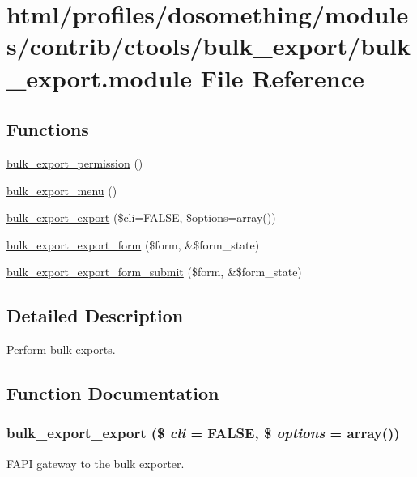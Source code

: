 \hypertarget{bulk__export_8module}{
\section{html/profiles/dosomething/modules/contrib/ctools/bulk\_\-export/bulk\_\-export.module File Reference}
\label{bulk__export_8module}
}
\subsection*{Functions}
\begin{DoxyCompactItemize}
\item 
\hyperlink{bulk__export_8module_a2a73fe75148a7d87b162a95e6ece51fe}{bulk\_\-export\_\-permission} ()
\item 
\hyperlink{bulk__export_8module_a7e9e45b8daed844ca0371fde54fa64d8}{bulk\_\-export\_\-menu} ()
\item 
\hyperlink{bulk__export_8module_a7607fa663a1a4bf08b865dbcad080b1d}{bulk\_\-export\_\-export} (\$cli=FALSE, \$options=array())
\item 
\hyperlink{bulk__export_8module_a8fbb895533c1a775e9c40a8dd335113c}{bulk\_\-export\_\-export\_\-form} (\$form, \&\$form\_\-state)
\item 
\hyperlink{bulk__export_8module_a5737240f3ea826550894b474535c67a0}{bulk\_\-export\_\-export\_\-form\_\-submit} (\$form, \&\$form\_\-state)
\end{DoxyCompactItemize}


\subsection{Detailed Description}
Perform bulk exports. 

\subsection{Function Documentation}
\hypertarget{bulk__export_8module_a7607fa663a1a4bf08b865dbcad080b1d}{
\subsubsection[{bulk\_\-export\_\-export}]{\setlength{\rightskip}{0pt plus 5cm}bulk\_\-export\_\-export (\$ {\em cli} = {\ttfamily FALSE}, \/  \$ {\em options} = {\ttfamily array()})}}
\label{bulk__export_8module_a7607fa663a1a4bf08b865dbcad080b1d}
FAPI gateway to the bulk exporter.


